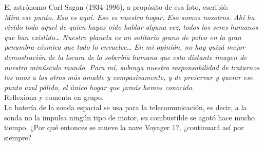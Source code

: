 \documentclass[11pt]{book}
\begin{document}
\begin{boxK}
  El astrónomo Carl Sagan (1934-1996), a propósito de esa foto, escribió:\\
  \emph{\small Mira ese punto. Eso es aquí. Eso es nuestro hogar. Eso somos nosotros.
    Ahí ha vivido todo aquel de quien hayas oído hablar alguna vez,
    todos los seres humanos que han existido\dots
    Nuestro planeta es un solitario grano de polvo en la gran penumbra
    cósmica que todo lo envuelve\dots
    En mi opinión, no hay quizá mejor demostración
    de la locura de la soberbia humana que esta distante imagen de nuestro minúsculo
    mundo. Para mí, subraya nuestra responsabilidad de tratarnos los unos a los
    otros más amable y compasivamente, y de preservar y querer ese punto azul pálido,
    el único hogar que jamás hemos conocido.}\\

  Reflexiona y comenta en grupo.\\

  La batería de la sonda espacial se usa para la telecomunicación, es decir, a la sonda no la impulsa ningún tipo de motor, su combustible se agotó hace mucho tiempo. ¿Por qué entonces se mueve la nave Voyager 1?, ¿continuará así por siempre?
\end{boxK}
\end{document}
